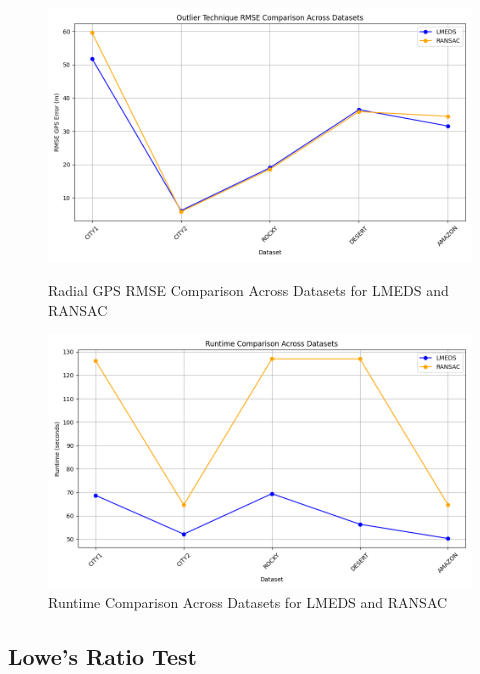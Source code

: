 \begin{figure}[H]
    \centering
    \begin{minipage}{0.45\textwidth}
        \centering
        \includegraphics[width=\textwidth]{./Chapter 4/testresults/ransaclmedsrmse.png}
        \caption{Radial GPS RMSE Comparison Across Datasets for LMEDS and RANSAC}
        \label{fig:rmse_comparisonlmeds}
    \end{minipage}\hfill
    \begin{minipage}{0.45\textwidth}
        \centering
        \includegraphics[width=\textwidth]{./Chapter 4/testresults/ransaclmedsruntime.png}
        \caption{Runtime Comparison Across Datasets for LMEDS and RANSAC}
        \label{fig:runtime_comparisonlmeds}
    \end{minipage}
\end{figure}



\subsection{Lowe's Ratio Test}

